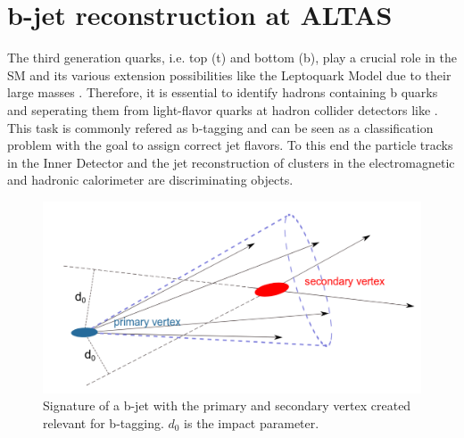 \section{b-jet reconstruction at ALTAS}\label{btagging}
The third generation quarks, i.e. top (t) and bottom (b), play a crucial role in the SM and its various extension possibilities like the Leptoquark Model due to their large masses \cite{Hansson}. Therefore, it is essential to identify hadrons containing b quarks and seperating them from light-flavor quarks at hadron collider detectors like {\ATLAS}. This task is commonly refered as b-tagging and can be seen as a classification problem with the goal to assign correct jet flavors. To this end the particle tracks in the Inner Detector and the jet reconstruction of clusters in the electromagnetic and hadronic calorimeter are discriminating objects. \cite{Paganini}\par
%
\begin{figure}[htbp]                                 
 \begin{center}                                       
  \includegraphics[width=0.55\linewidth]{figures/btagged.pdf} 
   \caption[Tracks in a b-jet.]{Signature of a b-jet with the primary and secondary vertex created relevant for b-tagging. $d_0$ is the impact parameter. \cite{Hansson}}
  \label{btagged}                                    
 \end{center}
\end{figure}
%

